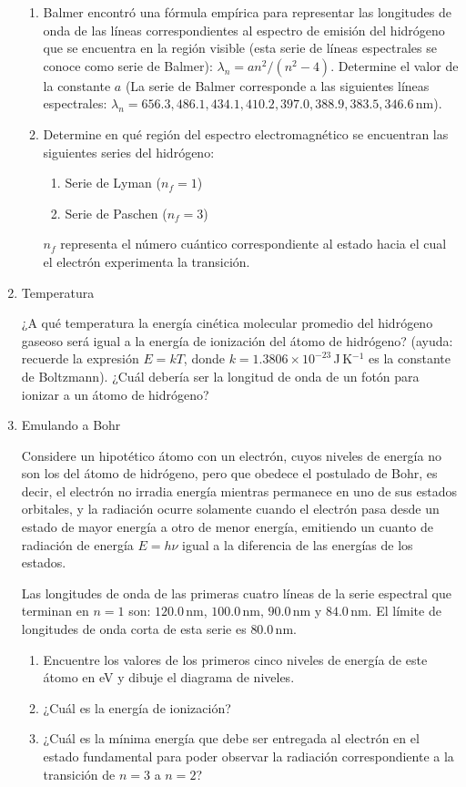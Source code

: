 \documentclass[a4paper,12pt]{article}
\begin{document}
\begin{enumerate}
\begin{enumerate}
\item Balmer encontró una fórmula empírica para representar las longitudes de
onda de las líneas correspondientes al espectro de emisión del hidrógeno que se
encuentra en la región visible (esta serie de líneas espectrales se conoce como
serie de Balmer): $\lambda_n = a n^2 / (n^2 - 4)$. Determine el valor de la
constante $a$ (La serie de Balmer corresponde a las siguientes líneas
espectrales: $\lambda_n=656.3, 486.1, 434.1, 410.2, 397.0, 388.9, 383.5,
346.6$\,nm).
\item Determine en qué región del espectro electromagnético se encuentran las
siguientes series del hidrógeno:
\begin{enumerate}
\item Serie de Lyman ($n_f = 1$)
\item Serie de Paschen ($n_f = 3$)
\end{enumerate}
$n_f$ representa el número cuántico correspondiente al estado hacia el cual el
electrón experimenta la transición.
\end{enumerate}

\item {Temperatura}

¿A qué temperatura la energía cinética molecular promedio del hidrógeno gaseoso
será igual a la energía de ionización del átomo de hidrógeno? (ayuda: recuerde
la expresión $E=k T$, donde $k=1.3806 \times 10^{-23}$\,J\,K$^{-1}$ es la
constante de Boltzmann). ¿Cuál debería ser la longitud de onda de un fotón para
ionizar a un átomo de hidrógeno?

\item {Emulando a Bohr}

Considere un hipotético átomo con un electrón, cuyos niveles de energía no son
los del átomo de hidrógeno, pero que obedece el postulado de Bohr, es decir, el
electrón no irradia energía mientras permanece en uno de sus estados orbitales,
y la radiación ocurre solamente cuando el electrón pasa desde un estado de
mayor energía a otro de menor energía, emitiendo un cuanto de radiación de
energía $E=h\nu$ igual a la diferencia de las energías de los estados. 

Las longitudes de onda de las primeras cuatro líneas de la serie espectral que
terminan en $n = 1$ son: $120.0$\,nm, $100.0$\,nm, $90.0$\,nm y $84.0$\,nm. El
límite de longitudes de onda corta de esta serie es $80.0$\,nm.

\begin{enumerate}
\item Encuentre los valores de los primeros cinco niveles de energía de este
átomo en eV y dibuje el diagrama de niveles.
\item ¿Cuál es la energía de ionización?
\item ¿Cuál es la mínima energía que debe ser entregada al electrón en el
estado fundamental para poder observar la radiación correspondiente a la
transición de $n = 3$ a $n = 2$?
\end{enumerate}


\end{enumerate}
\end{document}
